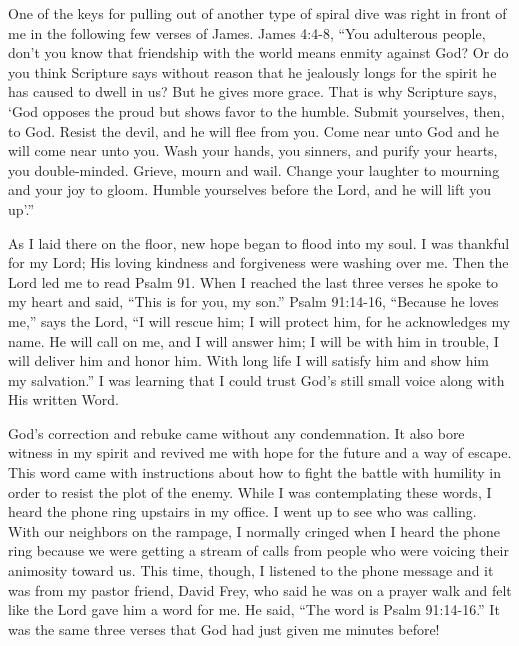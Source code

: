 \documentclass[twoside, 12pt]{book}
\begin{document}
One of the keys for pulling out of another type of spiral dive was right in front of me in the following few verses of James. James 4:4-8, “You adulterous people, don't you know that friendship with the world means enmity against God? Or do you think Scripture says without 
reason that he jealously longs for the spirit he has caused to dwell in us? But he gives more grace. That is why Scripture says, ‘God opposes the proud but shows favor to the humble. Submit yourselves, then, to God. Resist the devil, and he will flee from you. Come near unto God and he will come near unto you. Wash your hands, you sinners, and purify your hearts, you double-minded. Grieve, mourn and wail. Change your laughter to mourning and your joy to gloom. Humble yourselves before the Lord, and he will lift you up’.”

As I laid there on the floor, new hope began to flood into my soul. I was thankful for my Lord; His loving kindness and forgiveness were washing over me. Then the Lord led me to read Psalm 91. When I reached the last three verses he spoke to my heart and said, “This is for you, my son.” Psalm 91:14-16, “Because he loves me,” says the Lord, “I will rescue him; I will protect him, for he acknowledges my name. He will call on me, and I will answer him; I will be with him in trouble, I will deliver him and honor him. With long life I will satisfy him and show him my salvation.” I was learning that I could trust God's still small voice along with His written Word. 

God’s correction and rebuke came without any condemnation. It also bore witness in my spirit and revived me with hope for the future and a way of escape. This word came with instructions about how to fight the battle with humility in order to resist the plot of the enemy. While I was contemplating these words, I heard the phone ring upstairs in my office. I went up to see who was calling. With our neighbors on the rampage, I normally cringed when I heard the phone ring because we were getting a stream of calls from people who were voicing their animosity toward us. This time, though, I listened to the phone message and it was from my pastor friend, David Frey, who said he was on a prayer walk and felt like the Lord gave him a word for me. He said, “The word is Psalm 91:14-16.” It was the same three verses that God had just given me minutes before!
\end{document}

